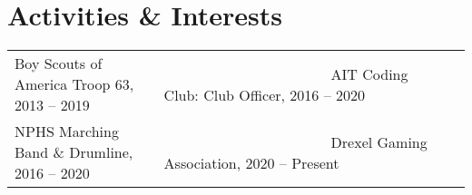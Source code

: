\documentclass[letterpaper,11pt]{article}
\begin{document}
\section{\textcolor{HeaderColor}{\textbf{\large Activities \& Interests}}}
\begin{itemize}[leftmargin=0in, label={}]
	{\item{
		\begin{tabular}{l l l}
			{Boy Scouts of America Troop 63, 2013 -- 2019} & {~~~~~~~~~~~~~~~~~~~~~~~AIT Coding Club: Club Officer, 2016 -- 2020} \\
			{NPHS Marching Band \& Drumline, 2016 -- 2020} & {~~~~~~~~~~~~~~~~~~~~~~~Drexel Gaming Association, 2020 -- Present}
		\end{tabular}
	}}
\end{itemize}

\end{document}
